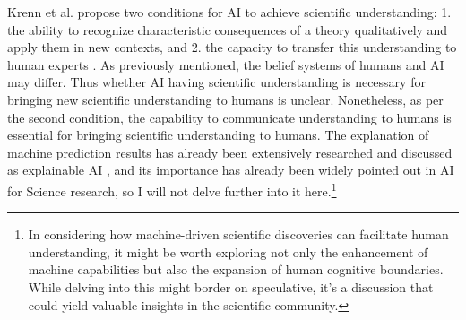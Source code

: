 Krenn et al. propose two conditions for AI to achieve scientific understanding: 1. the ability to recognize characteristic consequences of a theory qualitatively and apply them in new contexts, and 2. the capacity to transfer this understanding to human experts \cite{krenn2022scientific}.  As previously mentioned, the belief systems of humans and AI may differ. Thus whether AI having scientific understanding is necessary for bringing new scientific understanding to humans is unclear. Nonetheless, as per the second condition, the capability to communicate understanding to humans is essential for bringing scientific understanding to humans. The explanation of machine prediction results has already been extensively researched and discussed as explainable AI \cite{arrieta2020explainable}, and its importance has already been widely pointed out in AI for Science research, so I will not delve further into it here.\footnote{
In considering how machine-driven scientific discoveries can facilitate human understanding, it might be worth exploring not only the enhancement of machine capabilities but also the expansion of human cognitive boundaries. While delving into this might border on speculative, it's a discussion that could yield valuable insights in the scientific community.
}




